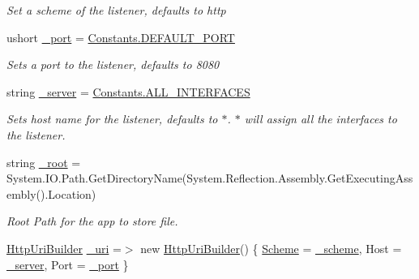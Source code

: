 \begin{DoxyCompactItemize}
\begin{DoxyCompactList}\small\item\em Set a scheme of the listener, defaults to http \end{DoxyCompactList}\item 
ushort \mbox{\hyperlink{class_concord_1_1_c3_http_module_1_1_web_server_a2f1c06a69c766d913ac41c4e8a7a2c1b}{\+\_\+port}} = \mbox{\hyperlink{class_concord_1_1_c3_http_module_1_1_constants_a4790c1697961574b369f80040d3fa9da}{Constants.\+D\+E\+F\+A\+U\+L\+T\+\_\+\+P\+O\+RT}}
\begin{DoxyCompactList}\small\item\em Sets a port to the listener, defaults to 8080 \end{DoxyCompactList}\item 
string \mbox{\hyperlink{class_concord_1_1_c3_http_module_1_1_web_server_aac6507ed60e7bf9ac62740a84a4b1c70}{\+\_\+server}} = \mbox{\hyperlink{class_concord_1_1_c3_http_module_1_1_constants_a3fe72e8bc32c96064538c8af8199c478}{Constants.\+A\+L\+L\+\_\+\+I\+N\+T\+E\+R\+F\+A\+C\+ES}}
\begin{DoxyCompactList}\small\item\em Sets host name for the listener, defaults to $\ast$. $\ast$ will assign all the interfaces to the listener. \end{DoxyCompactList}\item 
string \mbox{\hyperlink{class_concord_1_1_c3_http_module_1_1_web_server_a4119b37aad2d9713f2307bd854de122b}{\+\_\+root}} = System.\+I\+O.\+Path.\+Get\+Directory\+Name(System.\+Reflection.\+Assembly.\+Get\+Executing\+Assembly().Location)
\begin{DoxyCompactList}\small\item\em Root Path for the app to store file. \end{DoxyCompactList}\item 
\mbox{\hyperlink{class_concord_1_1_c3_http_module_1_1_http_uri_builder}{Http\+Uri\+Builder}} \mbox{\hyperlink{class_concord_1_1_c3_http_module_1_1_web_server_a9f3645e16eef4385e06108fbb0b3ad7a}{\+\_\+uri}} =$>$ new \mbox{\hyperlink{class_concord_1_1_c3_http_module_1_1_http_uri_builder}{Http\+Uri\+Builder}}() \{ \mbox{\hyperlink{class_concord_1_1_c3_http_module_1_1_web_server_a372194bcca0a119f079abe7f767dee71}{Scheme}} = \mbox{\hyperlink{class_concord_1_1_c3_http_module_1_1_web_server_a1d7bbb290d534e300796f0cc3024ca53}{\+\_\+scheme}}, Host = \mbox{\hyperlink{class_concord_1_1_c3_http_module_1_1_web_server_aac6507ed60e7bf9ac62740a84a4b1c70}{\+\_\+server}}, Port = \mbox{\hyperlink{class_concord_1_1_c3_http_module_1_1_web_server_a2f1c06a69c766d913ac41c4e8a7a2c1b}{\+\_\+port}} \}

\end{DoxyCompactItemize}

